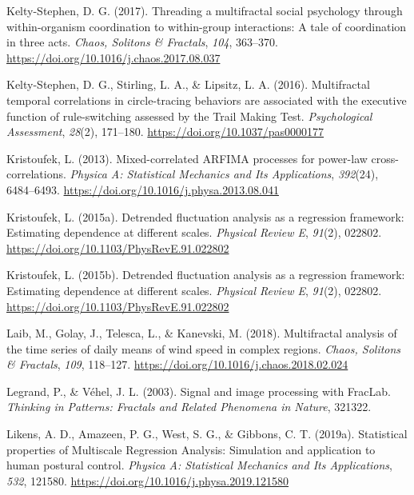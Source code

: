 \documentclass[
  man]{apa6}
\newlength{\cslhangindent}
\newlength{\cslentryspacingunit} %
\newenvironment{CSLReferences}[2] %
 {%
  \setlength{\parindent}{0pt}
  \ifodd #1
  \let\oldpar\par
  \def\par{\hangindent=\cslhangindent\oldpar}
  \fi
  \setlength{\parskip}{#2\cslentryspacingunit}
 }%
 {}
\begin{document}
\begin{CSLReferences}{1}{0}
\leavevmode{}%
Kelty-Stephen, D. G. (2017). Threading a multifractal social psychology through within-organism coordination to within-group interactions: {A} tale of coordination in three acts. \emph{Chaos, Solitons \& Fractals}, \emph{104}, 363--370. \url{https://doi.org/10.1016/j.chaos.2017.08.037}

\leavevmode{}%
Kelty-Stephen, D. G., Stirling, L. A., \& Lipsitz, L. A. (2016). Multifractal temporal correlations in circle-tracing behaviors are associated with the executive function of rule-switching assessed by the {Trail} {Making} {Test}. \emph{Psychological Assessment}, \emph{28}(2), 171--180. \url{https://doi.org/10.1037/pas0000177}

\leavevmode{}%
Kristoufek, L. (2013). Mixed-correlated {ARFIMA} processes for power-law cross-correlations. \emph{Physica A: Statistical Mechanics and Its Applications}, \emph{392}(24), 6484--6493. \url{https://doi.org/10.1016/j.physa.2013.08.041}

\leavevmode{}%
Kristoufek, L. (2015a). Detrended fluctuation analysis as a regression framework: {Estimating} dependence at different scales. \emph{Physical Review E}, \emph{91}(2), 022802. \url{https://doi.org/10.1103/PhysRevE.91.022802}

\leavevmode{}%
Kristoufek, L. (2015b). Detrended fluctuation analysis as a regression framework: Estimating dependence at different scales. \emph{Physical Review E}, \emph{91}(2), 022802. \url{https://doi.org/10.1103/PhysRevE.91.022802}

\leavevmode{}%
Laib, M., Golay, J., Telesca, L., \& Kanevski, M. (2018). Multifractal analysis of the time series of daily means of wind speed in complex regions. \emph{Chaos, Solitons \& Fractals}, \emph{109}, 118--127. \url{https://doi.org/10.1016/j.chaos.2018.02.024}

\leavevmode{}%
Legrand, P., \& Véhel, J. L. (2003). Signal and image processing with FracLab. \emph{Thinking in Patterns: Fractals and Related Phenomena in Nature}, 321322.

\leavevmode{}%
Likens, A. D., Amazeen, P. G., West, S. G., \& Gibbons, C. T. (2019a). Statistical properties of {Multiscale} {Regression} {Analysis}: {Simulation} and application to human postural control. \emph{Physica A: Statistical Mechanics and Its Applications}, \emph{532}, 121580. \url{https://doi.org/10.1016/j.physa.2019.121580}


\end{CSLReferences}
\end{document}
